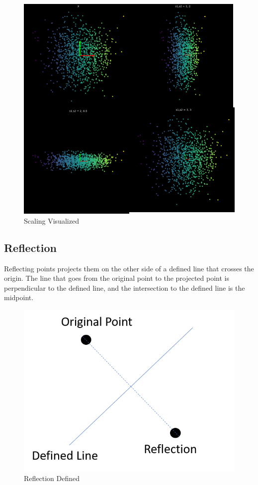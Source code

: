 \begin{figure}[h!]
\begin{center}
\includegraphics{labs/01/images/Scaling.png}
\caption{Scaling Visualized}
\end{center} 
\end{figure}


\subsection{Reflection}
Reflecting points projects them on the other side of a defined line that crosses the origin. 
The line that goes from the original point to the projected point is perpendicular to the defined line, and the intersection to the defined line is the midpoint.


\begin{figure}[h!]
\begin{center}
\includegraphics{labs/01/images/reflection_example.png}
\end{center} 
\caption{Reflection Defined}
\end{figure}



